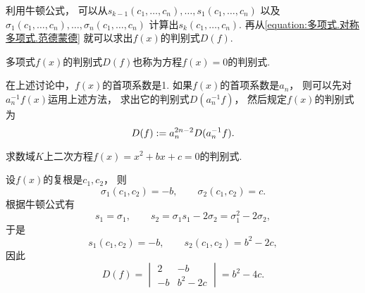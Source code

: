 利用牛顿公式，
可以从\(s_{k-1}(c_1,\dotsc,c_n),\dotsc,s_1(c_1,\dotsc,c_n)\)
以及\(\sigma_1(c_1,\dotsc,c_n),\dotsc,\sigma_n(c_1,\dotsc,c_n)\)
计算出\(s_k(c_1,\dotsc,c_n)\).
再从\cref{equation:多项式.对称多项式.范德蒙德}
就可以求出\(f(x)\)的判别式\(D(f)\).

多项式\(f(x)\)的判别式\(D(f)\)也称为方程\(f(x)=0\)的判别式.

\begin{remark}
在上述讨论中，\(f(x)\)的首项系数是1.
如果\(f(x)\)的首项系数是\(a_n\)，
则可以先对\(a_n^{-1} f(x)\)运用上述方法，
求出它的判别式\(D(a_n^{-1} f)\)，
然后规定\(f(x)\)的判别式为
\begin{equation}
	D(f)
	:=
	a_n^{2n-2} D(a_n^{-1} f).
\end{equation}
\end{remark}

\begin{example}
求数域\(K\)上二次方程\(f(x)=x^2+bx+c=0\)的判别式.
\begin{solution}
设\(f(x)\)的复根是\(c_1,c_2\)，
则\begin{equation*}
	\sigma_1(c_1,c_2)=-b, \qquad
	\sigma_2(c_1,c_2)=c.
\end{equation*}
根据牛顿公式有\begin{equation*}
	s_1=\sigma_1, \qquad
	s_2=\sigma_1 s_1 - 2\sigma_2
	=\sigma_1^2-2\sigma_2,
\end{equation*}
于是\begin{equation*}
	s_1(c_1,c_2)=-b, \qquad
	s_2(c_1,c_2)=b^2-2c,
\end{equation*}
因此\begin{equation*}
	D(f)
	=\begin{vmatrix}
		2 & -b \\
		-b & b^2-2c
	\end{vmatrix}
	=b^2-4c.
\end{equation*}
\end{solution}
\end{example}

